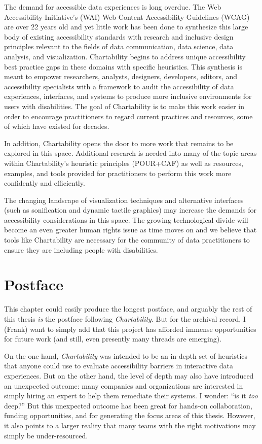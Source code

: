 \documentclass[12pt]{cmuthesis}
\begin{document}
The demand for accessible data experiences is long overdue. The Web Accessibility Initiative’s (WAI) Web Content Accessibility Guidelines (WCAG) are over 22 years old and yet little work has been done to synthesize this large body of existing accessibility standards with research and inclusive design principles relevant to the fields of data communication, data science, data analysis, and visualization. Chartability begins to address unique accessibility best practice gaps in these domains with specific heuristics. This synthesis is meant to empower researchers, analysts, designers, developers, editors, and accessibility specialists with a framework to audit the accessibility of data experiences, interfaces, and systems to produce more inclusive environments for users with disabilities. The goal of Chartability is to make this work easier in order to encourage practitioners to regard current practices and resources, some of which have existed for decades. 

In addition, Chartability opens the door to more work that remains to be explored in this space. Additional research is needed into many of the topic areas within Chartability’s heuristic principles (POUR+CAF) as well as resources, examples, and tools provided for practitioners to perform this work more confidently and efficiently. 

The changing landscape of visualization techniques and alternative interfaces (such as sonification and dynamic tactile graphics) may increase the demands for accessibility considerations in this space. The growing technological divide will become an even greater human rights issue as time moves on and we believe that tools like Chartability are necessary for the community of data practitioners to ensure they are including people with disabilities.

\newpage

\section{Postface}

This chapter could easily produce the longest postface, and arguably the rest of this thesis \textit{is} the postface following \textit{Chartability}. But for the archival record, I (Frank) want to simply add that this project has afforded immense opportunities for future work (and still, even presently many threads are emerging).

On the one hand, \textit{Chartability} was intended to be an in-depth set of heuristics that anyone could use to evaluate accessibility barriers in interactive data experiences. But on the other hand, the level of depth may also have introduced an unexpected outcome: many companies and organizations are interested in simply hiring an expert to help them remediate their systems. I wonder: ``is it \textit{too} deep?'' But this unexpected outcome has been great for hands-on collaboration, funding opportunities, and for generating the focus areas of this thesis. However, it also points to a larger reality that many teams with the right motivations may simply be under-resourced.
\end{document}
